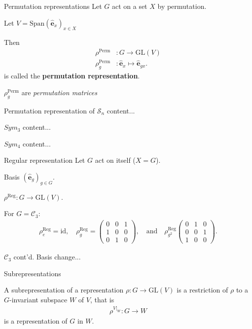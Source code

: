 \documentclass[handout,  12pt]{beamer}
\newcommand{\1}{\mathbf{1}}
\newcommand{\0}{\mathbf{0}}
\newcommand{\GL}{\text{GL}}
\newcommand{\id}{\text{id}}
\newcommand{\Sym}{\mathcal{S}} %
\newcommand{\Cyc}{\mathcal{C}}%
\newcommand{\Span}{\text{Span}}
\newcommand{\Reg}{\text{Reg}}
\newcommand{\Perm}{\text{Perm}}
\newcommand{\bas}{\mathbf{\hat{e}}}
\begin{document}
	\begin{frame}{Permutation representations}
		Let $G$ act on a set $X$ by permutation.
		
		Let $V = \Span (\bas_x)_{x \in X}$
		
		Then
		\begin{align*}
			\rho^\Perm &: G \rightarrow \GL(V) \\
			\rho^\Perm_g &: \bas_x \mapsto \bas_{gx}.
		\end{align*}
		is called the \textbf{permutation representation}.
		
		$\rho_g^\Perm$ are \textit{permutation matrices}
	\end{frame}
	
	\begin{frame}{Permutation representation of $\Sym_n$}
		content...
	\end{frame}
	
	\begin{frame}{$Sym_3$}
		content...
	\end{frame}
	
	\begin{frame}{$Sym_4$}
		content...
	\end{frame}
	
	\begin{frame}{Regular representation}
		Let $G$ act on itself ($X = G$).
		
		Basis $(\bas_g)_{g \in G}$.
		
		$\rho^\Reg : G \rightarrow \GL(V)$.
		
		For $G = \Cyc_3$:
		\begin{align*}
			\rho^\Reg_e = \id, \quad \rho^\Reg_g = \begin{pmatrix}
				0&0&1\\1&0&0\\0&1&0
			\end{pmatrix}, \quad \text{and} \quad \rho^\Reg_{g^2}\begin{pmatrix}
			0&1&0\\0&0&1\\1&0&0
			\end{pmatrix}.
		\end{align*}		
	\end{frame}
	
	\begin{frame}{$\Cyc_3$ cont'd.}
		Basis change...
	\end{frame}
	
	\begin{frame}{Subrepresentations}
		\begin{definition}
			A subrepresentation of a representation $\rho: G \rightarrow \GL(V)$ is a restriction of $\rho$ to a $G$-invariant subspace $W$ of $V$, that is
			\begin{align*}
				\rho^{V|_W}: G \rightarrow W
			\end{align*}
			is a representation of $G$ in $W$.
		\end{definition}
	\end{frame}
	
\end{document}
